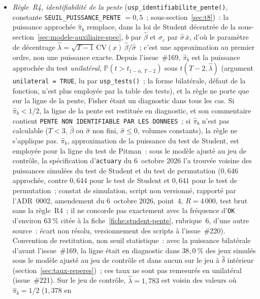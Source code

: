\documentclass[a4paper,11pt]{article}
\newcommand{\code}[1]{\texttt{\small #1}}
\begin{document}
\begin{itemize}[itemsep=1pt]
  \item \emph{Règle~R4, identifiabilité de la pente} (\code{usp\_identifiabilite\_}\allowbreak\code{pente()},
  constante \code{SEUIL\_PUISSANCE\_}\allowbreak\code{PENTE} $= 0{,}5$~; sous-section~\ref{sec:t8})~: la puissance
  approchée $\hat\pi_b$ remplace, dans la loi de Student décentrée de la
  sous-section~\ref{sec:modele-auxiliaire-spec}, $b$ par $\hat\beta$ et $\sigma_\varepsilon$ par
  $\hat\sigma\,\bar x$, d'où le paramètre de décentrage
  $\hat\lambda = \sqrt{T-1}\,\mathrm{CV}(x)\,\hat\beta/\hat\sigma$~; c'est une approximation au
  premier ordre, non une puissance exacte. Depuis l'issue~\#169, $\hat\pi_b$ est la puissance
  approchée du test \emph{unilatéral}, $\mathbb{P}(t > t_{1-\alpha,\,T-2})$ sous
  $t(T-2, \hat\lambda)$ (argument \code{unilateral = TRUE}, lu par \code{usp\_tests()}~; la
  forme bilatérale, défaut de la fonction, n'est plus employée par la table des tests), et la
  règle ne porte que sur la ligne de la pente, Fisher étant un diagnostic dans tous les cas. Si
  $\hat\pi_b < 1/2$, la ligne de la pente est restituée en diagnostic, et son commentaire contient
  \code{PENTE NON IDENTIFIABLE PAR LES DONNEES}~; si $\hat\pi_b$ n'est pas calculable ($T < 3$,
  $\hat\beta$ ou $\hat\sigma$ non fini, $\hat\sigma \le 0$, volumes constants), la règle ne
  s'applique pas. $\hat\pi_b$, approximation de la puissance du test de Student, est employée pour
  la ligne du test de Pitman~: sous le modèle ajusté au jeu de contrôle, la spécification
  d'\code{actuary} du 6~octobre 2026 l'a trouvée voisine des puissances simulées du test de Student et du test de permutation
  ($0{,}646$ approchée, contre $0{,}644$ pour le test de Student et $0{,}641$ pour le test de
  permutation~; constat de simulation, script non versionné, rapporté par l'ADR~0002, amendement
  du 6~octobre 2026, point~4, $R = 4\,000$, test brut sans la règle~R4~; il ne concorde pas
  exactement avec la fréquence d'\code{OK} d'environ $63~\%$ citée à la
  fiche~\ref{fiche:student-pente}, rubrique~6, d'une autre source~: écart non résolu, versionnement des scripts
  à l'issue~\#220). Convention de restitution, non seuil statistique~: avec la puissance
  bilatérale d'avant l'issue~\#169, la ligne était en diagnostic dans $38{,}0~\%$ des jeux simulés
  sous le modèle ajusté au jeu de contrôle et dans aucun sur le jeu à $\hat\delta$ intérieur
  (section~\ref{sec:taux-reperes})~; ces taux ne sont pas remesurés en unilatéral (issue~\#221). Sur le jeu de
  contrôle, $\hat\lambda = 1{,}783$ est voisin des valeurs où $\hat\pi_b = 1/2$ ($1{,}378$ en

\end{itemize}
\end{document}
